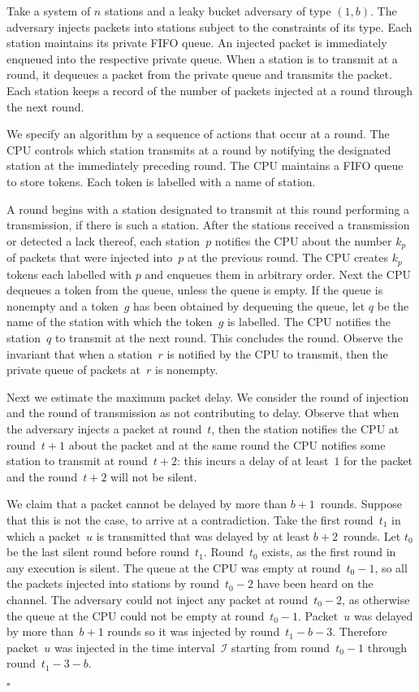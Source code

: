 \documentclass[11pt]{article}
\newcommand{\cI}{\mathcal{I}}
\newcommand{\qed}{\hfill $\square$ \smallbreak}
\newenvironment{proof}{\noindent{\bf Proof:}}{\qed}
\begin{document}
\begin{proof}
Take a system of $n$ stations and a leaky bucket adversary of type $(1,b)$.
The adversary injects packets into stations subject to the constraints of its type.
Each station maintains its private FIFO queue.
An injected packet is immediately enqueued into the respective private queue.
When a station is to transmit at a round, it dequeues a packet from the private queue and transmits the packet.
Each station keeps a record of the number of packets injected at a round through the next round.

We specify an algorithm by a sequence of actions that occur at a round.
The CPU controls which station transmits at a round by notifying the designated station at the immediately preceding round.
The CPU maintains a FIFO queue to store tokens.
Each token is labelled with a name of station.

A round begins with a station designated to transmit at this round performing a transmission, if there is such a station.
After the stations received a transmission or detected a lack thereof, each station~$p$ notifies the CPU about the number $k_p$ of packets that were injected into~$p$ at the previous round.
The CPU creates $k_p$ tokens each labelled with $p$ and enqueues them in arbitrary order.
Next the CPU dequeues a token from the queue, unless the queue is empty.
If the queue is nonempty and a token~$g$ has been obtained by dequeuing the queue, let $q$ be the name of the station with which the token~$g$ is labelled.
The CPU notifies the station~$q$ to transmit at the next round.
This concludes the round.
Observe the invariant that when a station~$r$ is notified by the CPU to transmit, then the private queue of packets at~$r$ is nonempty.

Next we estimate the maximum packet delay.
We consider the round of injection and the round of transmission as not contributing to delay.
Observe that when the adversary injects a packet at round~$t$, then the station notifies the CPU at round~$t+1$ about the packet and at the same round the CPU notifies some station to transmit at round~$t+2$: this incurs a delay of at least~$1$ for the packet and the round~$t+2$ will not be silent.

We claim that a packet cannot be delayed by more than $b+1$~rounds.
Suppose that this is not the case, to arrive at a contradiction.
Take the first round~$t_1$ in which a packet~$u$ is transmitted that was delayed by at least $b+2$~rounds.
Let $t_0$ be the last silent round before round~$t_1$.
Round~$t_0$ exists, as the first round in any execution is silent.
The queue at the CPU was empty at round~$t_0-1$, so all the packets injected into stations by round~$t_0-2$ have been heard on the channel.
The adversary could not inject any packet at round~$t_0-2$, as otherwise the queue at the CPU could not be empty at round~$t_0-1$.
Packet~$u$ was delayed by more than~$b+1$ rounds so it was injected by round~$t_1-b-3$.
Therefore packet~$u$ was injected in the time interval~$\cI$ starting from round~$t_0-1$ through round~$t_1-3-b$.


\end{proof}
\end{document}
